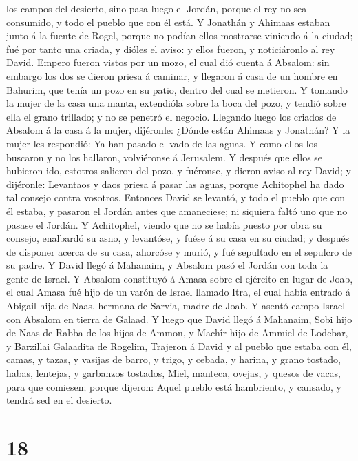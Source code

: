 los campos del desierto, sino pasa luego el Jordán, porque el rey no sea
consumido, y todo el pueblo que con él está.  Y Jonathán y
Ahimaas estaban junto á la fuente de Rogel, porque no podían ellos
mostrarse viniendo á la ciudad; fué por tanto una criada, y dióles el
aviso: y ellos fueron, y noticiáronlo al rey David.  Empero
fueron vistos por un mozo, el cual dió cuenta á Absalom: sin embargo los
dos se dieron priesa á caminar, y llegaron á casa de un hombre en
Bahurim, que tenía un pozo en su patio, dentro del cual se metieron.
 Y tomando la mujer de la casa una manta, extendióla sobre
la boca del pozo, y tendió sobre ella el grano trillado; y no se penetró
el negocio.  Llegando luego los criados de Absalom á la
casa á la mujer, dijéronle: ¿Dónde están Ahimaas y Jonathán? Y la mujer
les respondió: Ya han pasado el vado de las aguas. Y como ellos los
buscaron y no los hallaron, volviéronse á Jerusalem.  Y
después que ellos se hubieron ido, estotros salieron del pozo, y
fuéronse, y dieron aviso al rey David; y dijéronle: Levantaos y daos
priesa á pasar las aguas, porque Achitophel ha dado tal consejo contra
vosotros.  Entonces David se levantó, y todo el pueblo que
con él estaba, y pasaron el Jordán antes que amaneciese; ni siquiera
faltó uno que no pasase el Jordán.  Y Achitophel, viendo
que no se había puesto por obra su consejo, enalbardó su asno, y
levantóse, y fuése á su casa en su ciudad; y después de disponer acerca
de su casa, ahorcóse y murió, y fué sepultado en el sepulcro de su
padre.  Y David llegó á Mahanaim, y Absalom pasó el Jordán
con toda la gente de Israel.  Y Absalom constituyó á Amasa
sobre el ejército en lugar de Joab, el cual Amasa fué hijo de un varón
de Israel llamado Itra, el cual había entrado á Abigail hija de Naas,
hermana de Sarvia, madre de Joab.  Y asentó campo Israel
con Absalom en tierra de Galaad.  Y luego que David llegó á
Mahanaim, Sobi hijo de Naas de Rabba de los hijos de Ammon, y Machîr
hijo de Ammiel de Lodebar, y Barzillai Galaadita de Rogelim,
 Trajeron á David y al pueblo que estaba con él, camas, y
tazas, y vasijas de barro, y trigo, y cebada, y harina, y grano tostado,
habas, lentejas, y garbanzos tostados,  Miel, manteca,
ovejas, y quesos de vacas, para que comiesen; porque dijeron: Aquel
pueblo está hambriento, y cansado, y tendrá sed en el desierto.

\hypertarget{section-17}{%
\section{18}\label{section-17}}

